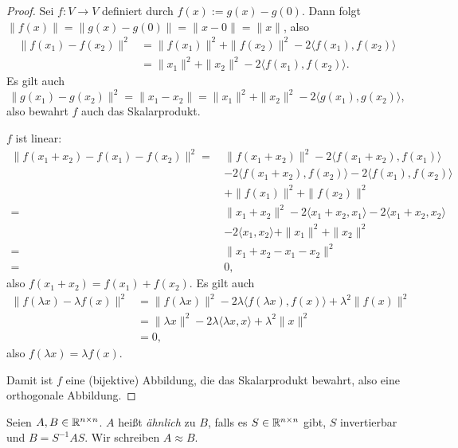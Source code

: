 \documentclass[
 a4paper,
 12pt,
 parskip=half
 ]{scrartcl}
\theoremstyle{plain}
\theoremstyle{definition}
\numberwithin{equation}{section}
\begin{document}
\begin{proof}
 Sei $f: V \to V$ definiert durch $f(x) := g(x) - g(0)$. Dann folgt $\| f(x) \| = \| g(x) - g(0) \| = \| x - 0 \| = \| x \|$, also
 \begin{align*}
\| f(x_1) - f(x_2) \|^2 
    &= \| f(x_1) \|^2 + \| f(x_2) \|^2 - 2 \langle f(x_1), f(x_2) \rangle \\
    &= \| x_1 \|^2 + \| x_2 \|^2 - 2 \langle f(x_1), f(x_2) \rangle.
 \end{align*}
 Es gilt auch
 \[ \| g(x_1) - g(x_2) \|^2 = \| x_1 - x_2 \| = \| x_1 \|^2 + \| x_2 \|^2 - 2 \langle g(x_1), g(x_2) \rangle, \]
 also bewahrt $f$ auch das Skalarprodukt.
 
 $f$ ist linear:
 \begin{align*} \| f(x_1 + x_2) - f(x_1) - f(x_2) \|^2 
    =\, &\| f(x_1 + x_2) \|^2 
      - 2 \langle f(x_1 + x_2), f(x_1) \rangle \\
    & - 2 \langle f(x_1 + x_2), f(x_2) \rangle
      - 2 \langle f(x_1 ), f(x_2) \rangle \\
    & + \| f(x_1) \|^2 + \| f(x_2) \|^2 \\
    =\, &\| x_1 + x_2 \|^2 
      - 2 \langle x_1 + x_2, x_1 \rangle
      - 2 \langle x_1 + x_2, x_2 \rangle \\
    & - 2 \langle x_1, x_2 \rangle
      + \| x_1 \|^2 + \| x_2 \|^2 \\
    =\, &\| x_1 + x_2 - x_1 - x_2 \|^2 \\
    =\, &0,
 \end{align*}
 also $f(x_1 + x_2) = f(x_1) + f(x_2)$. Es gilt auch
 \begin{align*} \| f(\lambda x) - \lambda f(x) \|^2 &= \| f( \lambda x ) \|^2 
      - 2 \lambda \langle f( \lambda x ), f( x ) \rangle 
      + \lambda^2 \| f(x) \|^2 \\
    &= \| \lambda x \|^2
      - 2 \lambda \langle \lambda x, x \rangle
      + \lambda^2 \| x \|^2 \\
    &= 0,
 \end{align*}
 also $f(\lambda x) = \lambda f(x)$.
 
 Damit ist $f$ eine (bijektive) Abbildung, die das Skalarprodukt bewahrt, also eine orthogonale Abbildung.
\end{proof}

\begin{mydef}[Ähnlichkeitsbegriff]
 Seien $A, B \in \mathbb{R}^{n \times n}$. $A$ heißt \emph{ähnlich} zu $B$, falls es $S \in \mathbb{R}^{n \times n}$ gibt, $S$ invertierbar und $B = S^{-1} A S$. Wir schreiben $A \approx B$.
\end{mydef}
\end{document}
